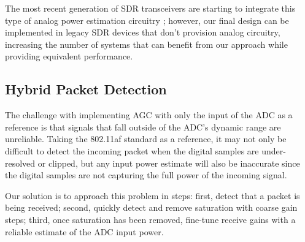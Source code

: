		The most recent generation of \ac{SDR} transceivers are starting to integrate this type of analog power estimation circuitry \cite{adi2018adrv9009}; however, our final design can be implemented in legacy \ac{SDR} devices that don't provision analog circuitry, increasing the number of systems that can benefit from our approach while providing equivalent performance.

%
%

\subsection{Hybrid Packet Detection}
\label{sec_pkt_detection}

	The challenge with implementing \ac{AGC} with only the input of the \ac{ADC} as a reference is that signals that fall outside of the ADC's dynamic range are unreliable.
	Taking the 802.11af standard as a reference, it may not only be difficult to detect the incoming packet when the digital samples are under-resolved or clipped, but any input power estimate will also be inaccurate since the digital samples are not capturing the full power of the incoming signal.

	Our solution is to approach this problem in steps: first, detect that a packet is being received; second, quickly detect and remove saturation with coarse gain steps; third, once saturation has been removed, fine-tune receive gains with a reliable estimate of the \ac{ADC} input power.

